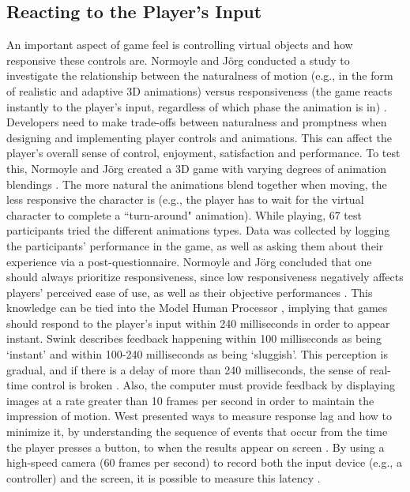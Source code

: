 \subsection{Reacting to the Player's Input}
An important aspect of game feel is controlling virtual objects and how responsive these controls are. Normoyle and J\"{o}rg conducted a study to investigate the relationship between the naturalness of motion (e.g., in the form of realistic and adaptive 3D animations) versus responsiveness (the game reacts instantly to the player's input, regardless of which phase the animation is in) \cite{normoyle_trade-offs_2014}. Developers need to make trade-offs between naturalness and promptness when designing and implementing player controls and animations. This can affect the player's overall sense of control, enjoyment, satisfaction and performance. To test this, Normoyle and J\"{o}rg  created a 3D game with varying degrees of animation blendings \cite{normoyle_trade-offs_2014}. The more natural the animations blend together when moving, the less responsive the character is (e.g., the player has to wait for the virtual character to complete a ``turn-around" animation). While playing, 67 test participants tried the different animations types.  Data was collected by logging the participants' performance in the game, as well as asking them about their experience via a post-questionnaire. Normoyle and J\"{o}rg concluded that one should always prioritize responsiveness, since low responsiveness negatively affects players' perceived ease of use, as well as their objective performances \cite{normoyle_trade-offs_2014}. This knowledge can be tied into the Model Human Processor \cite{card1986model, swink}, implying that games should respond to the player's input within 240 milliseconds in order to appear instant. Swink describes feedback happening within 100 milliseconds as being `instant' and within 100-240 milliseconds as being `sluggish'. This perception is gradual, and if there is a delay of more than 240 milliseconds, the sense of real-time control is broken \cite{swink}. Also, the computer must provide feedback by displaying images at a rate greater than 10 frames per second in order to maintain the impression of motion. West presented ways to measure response lag and how to minimize it, by understanding the sequence of events that occur from the time the player presses a button, to when the results appear on screen \cite{measure_lag, program_lag}. By using a high-speed camera (60 frames per second) to record both the input device (e.g., a controller) and the screen, it is possible to measure this latency \cite{euro}.

